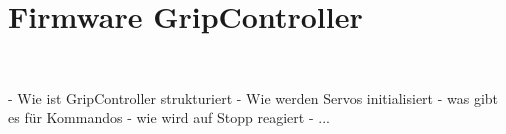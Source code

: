 \documentclass[main.tex]{subfiles} %
\begin{document}

\section{Firmware GripController}~\label{apdx:FirmwareGripController}

- Wie ist GripController strukturiert
- Wie werden Servos initialisiert
- was gibt es für Kommandos
- wie wird auf Stopp reagiert
- ...
\end{document}
